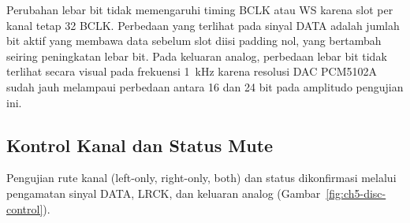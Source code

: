Perubahan lebar bit tidak memengaruhi timing BCLK atau WS karena slot per kanal tetap 32 BCLK. Perbedaan yang terlihat pada sinyal DATA adalah jumlah bit aktif yang membawa data sebelum slot diisi padding nol, yang bertambah seiring peningkatan lebar bit. Pada keluaran analog, perbedaan lebar bit tidak terlihat secara visual pada frekuensi 1~kHz karena resolusi DAC PCM5102A sudah jauh melampaui perbedaan antara 16 dan 24 bit pada amplitudo pengujian ini.

\subsection{Kontrol Kanal dan Status Mute}

Pengujian rute kanal (left-only, right-only, both) dan status  dikonfirmasi melalui pengamatan sinyal DATA, LRCK, dan keluaran analog (Gambar~\ref{fig:ch5-disc-control}).

